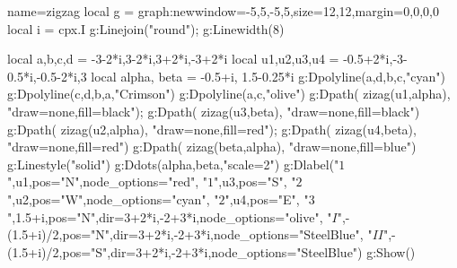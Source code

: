 \documentclass[12pt]{standalone}%
\begin{document}
\begin{luadraw}{name=zigzag}
local g = graph:new{window={-5,5,-5,5},size={12,12},margin={0,0,0,0}}
local i = cpx.I
g:Linejoin("round"); g:Linewidth(8)

local a,b,c,d = -3-2*i,3-2*i,3+2*i,-3+2*i
local u1,u2,u3,u4 = -0.5+2*i,-3-0.5*i,-0.5-2*i,3
local alpha, beta = -0.5+i, 1.5-0.25*i
g:Dpolyline({{a,d},{b,c}},"cyan")
g:Dpolyline({{c,d},{b,a}},"Crimson")
g:Dpolyline({a,c},"olive")
g:Dpath( zizag(u1,alpha), "draw=none,fill=black"); g:Dpath( zizag(u3,beta), "draw=none,fill=black")
g:Dpath( zizag(u2,alpha), "draw=none,fill=red"); g:Dpath( zizag(u4,beta), "draw=none,fill=red")
g:Dpath( zizag(beta,alpha), "draw=none,fill=blue")
g:Linestyle("solid")
g:Ddots({alpha,beta},"scale=2")
g:Dlabel("$1$",u1,{pos="N",node_options="red"}, "$1$",u3,{pos="S"},
"$2$",u2,{pos="W",node_options="cyan"}, "$2$",u4,{pos="E"},
"$3$",1.5+i,{pos="N",dir={3+2*i,-2+3*i},node_options="olive"},
"$I$",-(1.5+i)/2,{pos="N",dir={3+2*i,-2+3*i},node_options="SteelBlue"},
"$II$",-(1.5+i)/2,{pos="S",dir={3+2*i,-2+3*i},node_options="SteelBlue"})
g:Show()
\end{luadraw}
\end{document}

